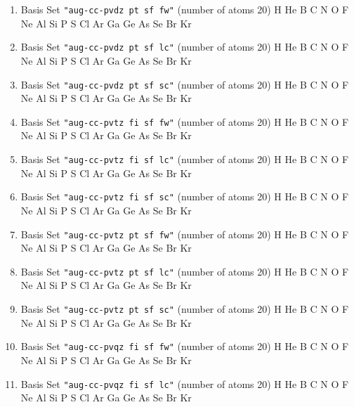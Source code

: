 \begin{enumerate}
\item Basis Set \verb#"aug-cc-pvdz pt sf fw"# (number of atoms 20)  \newline 
  H He B C N O F Ne Al Si P S Cl Ar Ga Ge As Se Br Kr


\item Basis Set \verb#"aug-cc-pvdz pt sf lc"# (number of atoms 20)  \newline 
  H He B C N O F Ne Al Si P S Cl Ar Ga Ge As Se Br Kr


\item Basis Set \verb#"aug-cc-pvdz pt sf sc"# (number of atoms 20)  \newline 
  H He B C N O F Ne Al Si P S Cl Ar Ga Ge As Se Br Kr


\item Basis Set \verb#"aug-cc-pvtz fi sf fw"# (number of atoms 20)  \newline 
  H He B C N O F Ne Al Si P S Cl Ar Ga Ge As Se Br Kr


\item Basis Set \verb#"aug-cc-pvtz fi sf lc"# (number of atoms 20)  \newline 
  H He B C N O F Ne Al Si P S Cl Ar Ga Ge As Se Br Kr


\item Basis Set \verb#"aug-cc-pvtz fi sf sc"# (number of atoms 20)  \newline 
  H He B C N O F Ne Al Si P S Cl Ar Ga Ge As Se Br Kr


\item Basis Set \verb#"aug-cc-pvtz pt sf fw"# (number of atoms 20)  \newline 
  H He B C N O F Ne Al Si P S Cl Ar Ga Ge As Se Br Kr


\item Basis Set \verb#"aug-cc-pvtz pt sf lc"# (number of atoms 20)  \newline 
  H He B C N O F Ne Al Si P S Cl Ar Ga Ge As Se Br Kr


\item Basis Set \verb#"aug-cc-pvtz pt sf sc"# (number of atoms 20)  \newline 
  H He B C N O F Ne Al Si P S Cl Ar Ga Ge As Se Br Kr


\item Basis Set \verb#"aug-cc-pvqz fi sf fw"# (number of atoms 20)  \newline 
  H He B C N O F Ne Al Si P S Cl Ar Ga Ge As Se Br Kr


\item Basis Set \verb#"aug-cc-pvqz fi sf lc"# (number of atoms 20)  \newline 
  H He B C N O F Ne Al Si P S Cl Ar Ga Ge As Se Br Kr



\end{enumerate}
